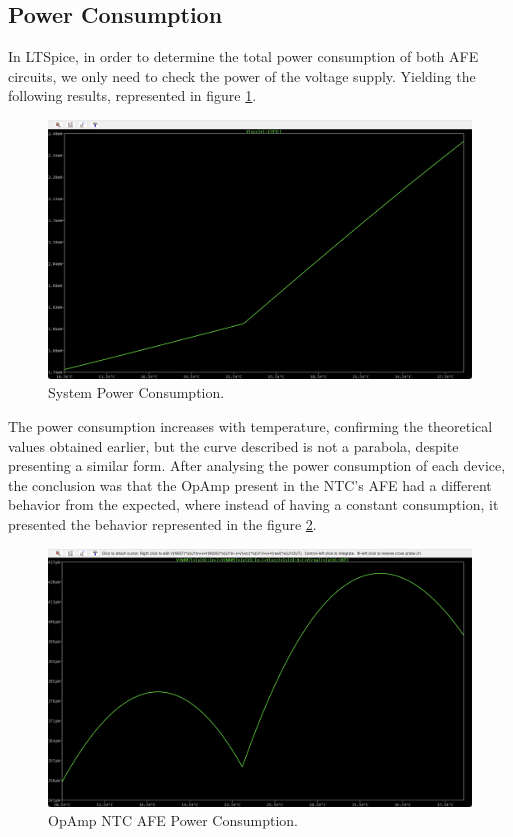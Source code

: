\documentclass[12pt]{article}
\begin{document}
    \subsection{Power Consumption}
    
    In LTSpice, in order to determine the total power consumption of both AFE circuits, we only need to check the power of the voltage supply.
    Yielding the following results, represented in figure \ref{powersim}.
        
    \begin{figure}[H] 
        \centering
        \includegraphics*[scale = 0.3]{images/PowerConsumption.png}
        \caption{System Power Consumption.}
        \label{powersim}
    \end{figure}

    The power consumption increases with temperature, confirming the theoretical values obtained earlier, but the curve described is not a parabola, despite presenting a similar form. After analysing the power consumption of each device, the conclusion was that the OpAmp present in the NTC's AFE had a different behavior from the expected, where instead of having a constant consumption, it presented the behavior represented in the figure \ref{OpAmpNTC}.
 
    \begin{figure}[H] 
        \centering
        \includegraphics*[scale = 0.3]{images/PowerAmpop.png}
        \caption{OpAmp NTC AFE Power Consumption.}
        \label{OpAmpNTC}
    \end{figure}
\end{document}
